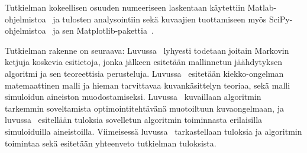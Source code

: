 Tutkielman kokeellisen osuuden numeeriseen laskentaan käytettiin Matlab-ohjelmistoa~\cite{matlab2014a} ja tulosten analysointiin sekä kuvaajien tuottamiseen myös SciPy-ohjelmistoa~\cite{jones01scipy} ja sen Matplotlib-pakettia~\cite{hunter07matplotlib}.

Tutkielman rakenne on seuraava:
Luvussa~ lyhyesti todetaan joitain Markovin ketjuja koskevia esitietoja,
jonka jälkeen esitetään mallinnetun jäähdytyksen algoritmi ja sen teoreettisia perusteluja.
Luvussa~ esitetään kiekko-ongelman matemaattinen malli ja hieman tarvittavaa kuvankäsittelyn teoriaa,
sekä malli simuloidun aineiston muodostamiseksi.
Luvussa~ kuvaillaan algoritmin tarkemmin soveltamista optimointitehtävänä muotoiltuun kuvaongelmaan,
ja luvussa~ esitellään tuloksia sovelletun algoritmin toiminnasta erilaisilla simuloiduilla aineistoilla.
Viimeisessä luvussa~ tarkastellaan tuloksia ja algoritmin toimintaa sekä esitetään yhteenveto tutkielman tuloksista.

